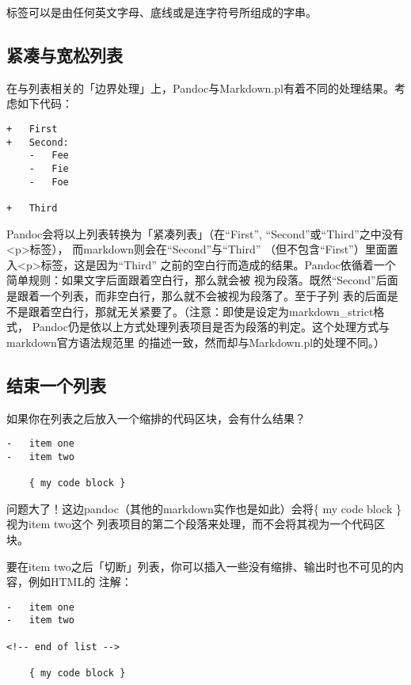 \documentclass[fancyhdr,bookmark]{ctexbook}
\begin{document}
标签可以是由任何英文字母、底线或是连字符号所组成的字串。

\hypertarget{ux7d27ux51d1ux4e0eux5bbdux677eux5217ux8868}{%
\subsection{紧凑与宽松列表}\label{ux7d27ux51d1ux4e0eux5bbdux677eux5217ux8868}}

在与列表相关的「边界处理」上，Pandoc与Markdown.pl有着不同的处理结果。考虑如下代码：

\begin{lstlisting}
+   First
+   Second:
    -   Fee
    -   Fie
    -   Foe

+   Third
\end{lstlisting}

Pandoc会将以上列表转换为「紧凑列表」（在``First'',
``Second''或``Third''之中没有\textless p\textgreater 标签），
而markdown则会在``Second''与``Third''
（但不包含``First''）里面置入\textless p\textgreater 标签，这是因为``Third''
之前的空白行而造成的结果。Pandoc依循着一个简单规则：如果文字后面跟着空白行，那么就会被
视为段落。既然``Second''后面是跟着一个列表，而非空白行，那么就不会被视为段落了。至于子列
表的后面是不是跟着空白行，那就无关紧要了。（注意：即使是设定为markdown\_strict格式，
Pandoc仍是依以上方式处理列表项目是否为段落的判定。这个处理方式与markdown官方语法规范里
的描述一致，然而却与Markdown.pl的处理不同。）

\hypertarget{ux7ed3ux675fux4e00ux4e2aux5217ux8868}{%
\subsection{结束一个列表}\label{ux7ed3ux675fux4e00ux4e2aux5217ux8868}}

如果你在列表之后放入一个缩排的代码区块，会有什么结果？

\begin{lstlisting}
-   item one
-   item two

    { my code block }
\end{lstlisting}

问题大了！这边pandoc（其他的markdown实作也是如此）会将\{ my code block
\}视为item two这个
列表项目的第二个段落来处理，而不会将其视为一个代码区块。

要在item
two之后「切断」列表，你可以插入一些没有缩排、输出时也不可见的内容，例如HTML的
注解：

\begin{lstlisting}
-   item one
-   item two

<!-- end of list -->

    { my code block }
\end{lstlisting}
\end{document}
